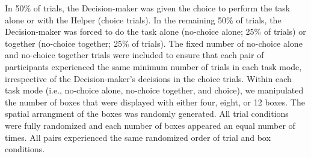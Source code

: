 \documentclass[
  man,
  floatsintext,
  longtable,
  nolmodern,
  notxfonts,
  notimes,
  mask,
  colorlinks=true,linkcolor=blue,citecolor=blue,urlcolor=blue]{apa7}
\begin{document}
In 50\% of trials, the Decision-maker was given the choice to perform
the task alone or with the Helper (choice trials). In the remaining 50\%
of trials, the Decision-maker was forced to do the task alone (no-choice
alone; 25\% of trials) or together (no-choice together; 25\% of trials).
The fixed number of no-choice alone and no-choice together trials were
included to ensure that each pair of participants experienced the same
minimum number of trials in each task mode, irrespective of the
Decision-maker's decisions in the choice trials. Within each task mode
(i.e., no-choice alone, no-choice together, and choice), we manipulated
the number of boxes that were displayed with either four, eight, or 12
boxes. The spatial arrangment of the boxes was randomly generated. All
trial conditions were fully randomized and each number of boxes appeared
an equal number of times. All pairs experienced the same randomized
order of trial and box conditions.
\end{document}
